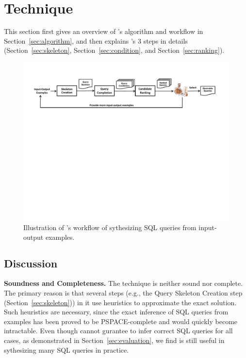 
\section{Technique}
\label{sec:approach}

This section first gives an overview of \ourtool's
algorithm and workflow in Section~\ref{sec:algorithm}, and
then explains \ourtool's 3 steps in details (Section~\ref{sec:skeleton},
Section~\ref{sec:condition}, and Section~\ref{sec:ranking}).



\begin{figure}[t]
  \centering
  \includegraphics[scale=0.70]{workflow}
  \vspace*{-1.0ex}\caption {{\label{fig:workflow} Illustration
  of \ourtool's workflow of sythesizing SQL queries from input-output examples. 
}}

\end{figure}










\subsection{Discussion}
\label{sec:uim}


\noindent \textbf{Soundness and Completeness.} The \ourtool
technique is neither sound nor complete. The primary
reason is that several steps (e.g., the Query Skeleton Creation
step (Section~\ref{sec:skeleton})) in it use heuristics  
to approximate the exact solution. Such heuristics
are necessary, since the exact inference of SQL queries
from examples has been proved to be PSPACE-complete and would
quickly become intractable.
Even though \ourtool cannot gurantee to infer correct SQL queries
for all cases, as demonstrated in Section~\ref{sec:evaluation},
we find \ourtool
is still useful in sythesizing many SQL queries in practice.

